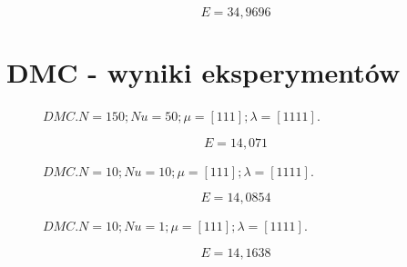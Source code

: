 \begin{equation}
    E = 34,9696
\end{equation}


%     



\section{DMC - wyniki eksperymentów}

\begin{figure}[H]
    \centering
    
    \caption{$DMC. N = 150; Nu = 50; \mu = [1 1 1]; \lambda = [1 1 1 1].$}
\end{figure}

\begin{equation}
    E = 14,071
\end{equation}


\begin{figure}[H]
    \centering
    
    \caption{$DMC. N = 10; Nu = 10; \mu = [1 1 1]; \lambda = [1 1 1 1].$}
\end{figure}

\begin{equation}
    E = 14,0854
\end{equation}


\begin{figure}[H]
    \centering
    
    \caption{$DMC. N = 10; Nu = 1; \mu = [1 1 1]; \lambda = [1 1 1 1].$}
\end{figure}

\begin{equation}
    E = 14,1638
\end{equation}


